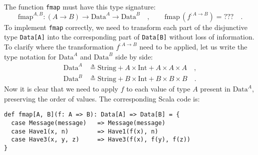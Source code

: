 The function \lstinline!fmap! must have this type signature:
\[
\text{fmap}^{A,B}:\left(A\rightarrow B\right)\rightarrow\text{Data}^{A}\rightarrow\text{Data}^{B}\quad,\quad\quad\text{fmap}\,(f^{:A\rightarrow B})=\text{???}\quad.
\]
To implement \lstinline!fmap! correctly, we need to transform each
part of the disjunctive type \lstinline!Data[A]! into the corresponding
part of \lstinline!Data[B]! without loss of information. To clarify
where the transformation $f^{:A\rightarrow B}$ need to be applied,
let us write the type notation for $\text{Data}^{A}$ and $\text{Data}^{B}$
side by side:
\begin{align*}
\text{Data}^{A} & \triangleq\text{String}+A\times\text{Int}+A\times A\times A\quad,\\
\text{Data}^{B} & \triangleq\text{String}+B\times\text{Int}+B\times B\times B\quad.
\end{align*}
Now it is clear that we need to apply $f$ to each value of type $A$
present in $\text{Data}^{A}$, preserving the order of values. The
corresponding Scala code is:
\begin{lstlisting}
def fmap[A, B](f: A => B): Data[A] => Data[B] = {
  case Message(message)   => Message(message)
  case Have1(x, n)        => Have1(f(x), n)
  case Have3(x, y, z)     => Have3(f(x), f(y), f(z))
}
\end{lstlisting}


